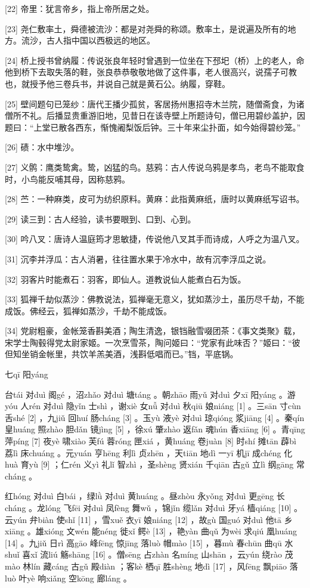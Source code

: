 \documentclass[12pt,UTF8]{ctexbook}
\begin{document}
[22] 帝里：犹言帝乡，指上帝所居之处。

[23] 尧仁敷率土，舜德被流沙：都是对尧舜的称颂。敷率土，是说遍及所有的地方。流沙，古人指中国以西极远的地区。

[24] 桥上授书曾纳履：传说张良年轻时曾遇到一位坐在下邳圯（桥）上的老人，命他到桥下去取失落的鞋，张良恭恭敬敬地做了这件事，老人很高兴，说孺子可教也，就授予他三卷兵书，并说自己就是黄石公。纳履，穿鞋。

[25] 壁间题句已笼纱：唐代王播少孤贫，客居扬州惠招寺木兰院，随僧斋食，为诸僧所不礼。后播显贵重游旧地，见昔日在该寺壁上所题诗句，僧已用碧纱盖护，因题曰：“上堂已散各西东，惭愧阇梨饭后钟。三十年来尘扑面，如今始得碧纱笼。”

[26] 碛：水中堆沙。

[27] 义鹘：鹰类鸷禽。鸷，凶猛的鸟。慈鸦：古人传说乌鸦是孝鸟，老鸟不能取食时，小鸟能反哺其母，因称慈鸦。

[28] 苎：一种麻类，皮可为纺织原料。黄麻：此指黄麻纸，唐时以黄麻纸写诏书。

[29] 读三到：古人经验，读书要眼到、口到、心到。

[30] 吟八叉：唐诗人温庭筠才思敏捷，传说他八叉其手而诗成，人呼之为温八叉。

[31] 沉李并浮瓜：古人消暑，往往置水果于冷水中，故有沉李浮瓜之说。

[32] 羽客片时能煮石：羽客，即仙人。道教说仙人能煮白石为饭。

[33] 狐禅千劫似蒸沙：佛教说法，狐禅毫无意义，犹如蒸沙土，虽历尽千劫，不能成饭。佛经云，狐禅如蒸沙，千劫不能成饭。

[34] 党尉粗豪，金帐笼香斟美酒；陶生清逸，银铛融雪啜团茶：《事文类聚》载，宋学士陶毂得党太尉家姬。一次烹雪茶，陶问姬曰：“党家有此味否？”姬曰：“彼但知坐销金帐里，共饮羊羔美酒，浅斟低唱而已。”铛，平底锅。





七qī 阳yáng


台tái 对duì 阁gé ，沼zhǎo 对duì 塘táng 。朝zhāo 雨yǔ 对duì 夕xī 阳yáng 。游yóu 人rén 对duì 隐yǐn 士shì ，谢xiè 女nǚ 对duì 秋qiū 娘niáng [1] 。三sān 寸cùn 舌shé [2] ，九jiǔ 回huí 肠cháng [3] 。玉yù 液yè 对duì 琼qióng 浆jiāng [4] 。秦qín 皇huáng 照zhào 胆dǎn 镜jìng [5] ，徐xú 肇zhào 返fǎn 魂hún 香xiāng [6] 。青qīng 萍píng [7] 夜yè 啸xiào 芙fú 蓉róng 匣xiá ，黄huáng 卷juàn [8] 时shí 摊tān 薜bì 荔lì 床chuáng 。元yuán 亨hēng 利lì 贞zhēn ，天tiān 地dì 一yī 机jī 成chéng 化huà 育yù [9] ；仁rén 义yì 礼lǐ 智zhì ，圣shèng 贤xián 千qiān 古gǔ 立lì 纲gāng 常cháng 。

红hóng 对duì 白bái ，绿lǜ 对duì 黄huáng 。昼zhòu 永yǒng 对duì 更gēng 长cháng 。龙lóng 飞fēi 对duì 凤fèng 舞wǔ ，锦jǐn 缆lǎn 对duì 牙yá 樯qiáng [10] 。云yún 弁biàn 使shǐ [11] ，雪xuě 衣yī 娘niáng [12] ，故gù 国guó 对duì 他tā 乡xiāng 。雄xióng 文wén 能néng 徙xǐ 鳄è [13] ，艳yàn 曲qǔ 为wèi 求qiú 凰huáng [14] 。九jiǔ 日rì 高gāo 峰fēng 惊jīng 落luò 帽mào [15] ，暮mù 春chūn 曲qū 水shuǐ 喜xǐ 流liú 觞shāng [16] 。僧sēng 占zhàn 名míng 山shān ，云yún 绕rào 茂mào 林lín 藏cáng 古gǔ 殿diàn ；客kè 栖qī 胜shèng 地dì [17] ，风fēng 飘piāo 落luò 叶yè 响xiǎng 空kōng 廊láng 。
\end{document}
